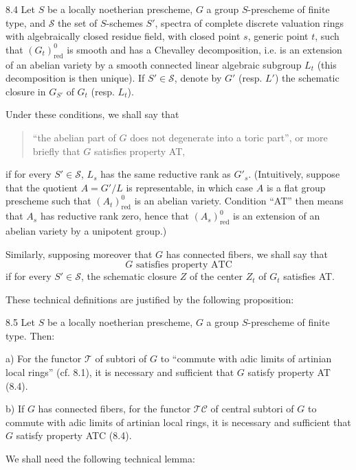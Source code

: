 \begin{definition}{8.4}\label{XV.8.4}
Let $S$ be a locally noetherian prescheme, $G$ a group $S$-prescheme of finite type, and $\mathscr S$ the set of $S$-schemes $S'$, spectra of complete discrete valuation rings with algebraically closed residue field, with closed point $s$, generic point $t$, such that $(G_t)^0_{\mathrm{red}}$ is smooth and has a Chevalley decomposition, i.e. is an extension of an abelian variety by a smooth connected linear algebraic subgroup $L_t$ (this decomposition is then unique). If $S'\in\mathscr S$, denote by $G'$ (resp. $L'$) the schematic closure in $G_{S'}$ of $G_t$ (resp. $L_t$).

Under these conditions, we shall say that
\begin{quote}
``the abelian part of $G$ does not degenerate into a toric part'', or more briefly that $G$ satisfies property AT,
\end{quote}
if for every $S'\in\mathscr S$, $L_s$ has the same reductive rank as $G'_s$. (Intuitively, suppose that the quotient $A=G'/L$ is representable, in which case $A$ is a flat group prescheme such that $(A_t)^0_{\mathrm{red}}$ is an abelian variety. Condition ``AT'' then means that $A_s$ has reductive rank zero, hence that $(A_s)^0_{\mathrm{red}}$ is an extension of an abelian variety by a unipotent group.)

Similarly, supposing moreover that $G$ has connected fibers, we shall say that
\[
\text{$G$ satisfies property ATC}
\]
if for every $S'\in\mathscr S$, the schematic closure $Z$ of the center $Z_t$ of $G_t$ satisfies AT.
\end{definition}
These technical definitions are justified by the following proposition:
\begin{proposition}{8.5}\label{XV.8.5}
Let $S$ be a locally noetherian prescheme, $G$ a group $S$-prescheme of finite type. Then:

\noindent a) For the functor $\mathscr T$ of subtori of $G$ to ``commute with adic limits of artinian local rings'' (cf. 8.1), it is necessary and sufficient that $G$ satisfy property AT (8.4).

\noindent b) If $G$ has connected fibers, for the functor $\mathscr{TC}$ of central subtori of $G$ to commute with adic limits of artinian local rings, it is necessary and sufficient that $G$ satisfy property ATC (8.4).
\end{proposition}
We shall need the following technical lemma:

